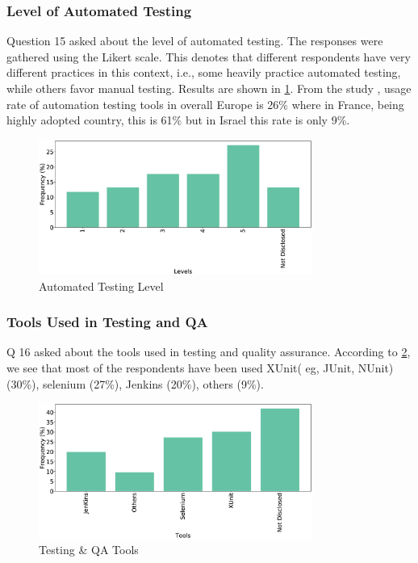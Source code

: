 \subsubsection{Level of Automated Testing}
Question 15 asked about the level of automated testing. The responses were gathered using the Likert scale. This denotes that different respondents have very different practices in this context, i.e., some heavily practice automated testing, while others favor manual testing. Results are shown in \ref{fig:autoTest}. From the study \cite{dutta1999}, usage rate of automation testing tools in overall Europe is 26\% where in France, being highly adopted country, this is 61\% but in Israel this rate is only 9\%.
\begin{figure}[htbp]
\centering
  \includegraphics[width=0.8\textwidth]{Figures/Respondents_autotest_level}
  \caption{Automated Testing Level}
  \label{fig:autoTest}
\end{figure}

\subsubsection{Tools Used in Testing and QA}
Q 16 asked about the tools used in testing and quality assurance. According to \ref{fig:testingTools}, we see that most of the respondents have been used XUnit( eg, JUnit, NUnit) (30\%), selenium (27\%), Jenkins (20\%), others (9\%). 
\begin{figure}[htbp]
\centering
  \includegraphics[width=0.8\textwidth]{Figures/Respondents_testing_tools}
  \caption{Testing \& QA Tools}
  \label{fig:testingTools}
\end{figure}

